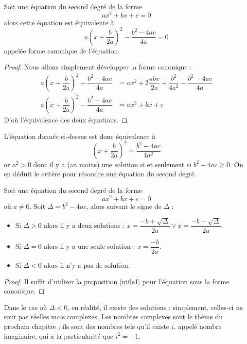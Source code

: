 \begin{defi}
    Soit une équation du second degré de la forme $$ax^2+bx+c=0$$ alors cette équation est équivalente à $$a\left(x+\dfrac{b}{2a}\right)^2-\dfrac{b^2-4ac}{4a}=0$$ appelée forme canonique de l'équation.
\end{defi}
\begin{proof}
    Nous allons simplement développer la forme canonique :
    \begin{align*}
        a\left(x+\dfrac{b}{2a}\right)^2-\dfrac{b^2-4ac}{4a} &= ax^2+2\dfrac{abx}{2a}+\dfrac{b^2}{4a^2}-\dfrac{b^2-4ac}{4a}\\
        a\left(x+\dfrac{b}{2a}\right)^2-\dfrac{b^2-4ac}{4a} &= ax^2+bx+c
    \end{align*}
    D'où l'équivalence des deux équations.
\end{proof}

L'équation donnée ci-dessus est donc équivalence à $$\left(x+\dfrac{b}{2a}\right)^2=\dfrac{b^2-4ac}{4a^2}$$ or $a^2>0$ donc il y a (au moins) une solution si et seulement si $b^2-4ac\geq 0$. On en déduit le critère pour résoudre une équation du second degré.

\begin{them}
    Soit une équation du second degré de la forme $$ax^2+bx+c=0$$ où $a\neq 0$. Soit $\Delta = b^2-4ac$, alors suivant le signe de $\Delta$ :
    \begin{itemize}[label=$\bullet$]
        \item Si $\Delta>0$ alors il y a deux solutions : $x=\dfrac{-b+\sqrt \Delta}{2a}\lor x=\dfrac{-b-\sqrt \Delta}{2a}$.
        \item Si $\Delta = 0$ alors il y a une seule solution : $x=\dfrac{-b}{2a}$.
        \item Si $\Delta < 0$ alors il n'y a pas de solution.
    \end{itemize}
\end{them}
\begin{proof}
    Il suffit d'utiliser la proposition \ref{utile1} pour l'équation sous la forme canonique.
\end{proof}

Dans le cas où $\Delta < 0$, en réalité, il existe des solutions : simplement, celles-ci ne sont pas réelles mais complexes. Les nombres complexes sont le thème du prochain chapitre ; ils sont des nombres tels qu'il existe $i$, appelé nombre imaginaire, qui a la particularité que $i^2=-1$.

\newpage